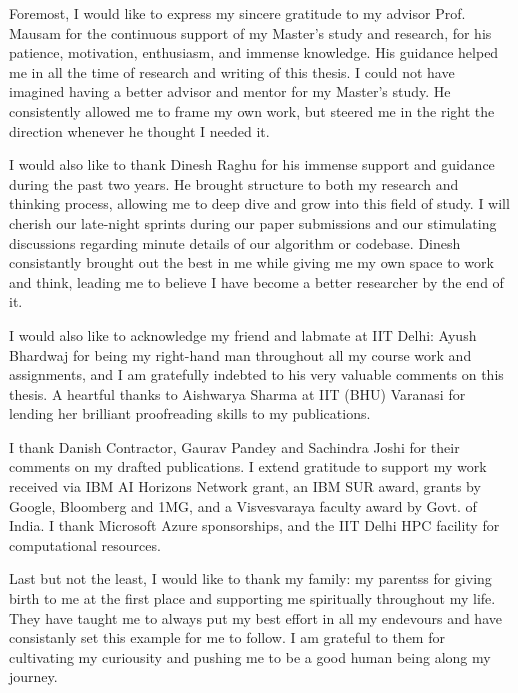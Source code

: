 Foremost, I would like to express my sincere gratitude to my advisor Prof. Mausam for the continuous support of my Master's study and research, for his patience, motivation, enthusiasm, and immense knowledge. His guidance helped me in all the time of research and writing of this thesis. I could not have imagined having a better advisor and mentor for my Master's study. He consistently allowed me to frame my own work, but steered me in the right the direction whenever he thought I needed it.

I would also like to thank Dinesh Raghu for his immense support and guidance during the past two years. He brought structure to both my research and thinking process, allowing me to deep dive and grow into this field of study. I will cherish our late-night sprints during our paper submissions and our stimulating discussions regarding minute details of our algorithm or codebase. Dinesh consistantly brought out the best in me while giving me my own space to work and think, leading me to believe I have become a better researcher by the end of it.

I would also like to acknowledge my friend and labmate at IIT Delhi: Ayush Bhardwaj for being my right-hand man throughout all my course work and assignments, and I am gratefully indebted to his very valuable comments on this thesis. A heartful thanks to Aishwarya Sharma at IIT (BHU) Varanasi for lending her brilliant proofreading skills to my publications.

I thank Danish Contractor, Gaurav Pandey and Sachindra Joshi for their comments on my drafted publications. I extend gratitude to support my work received via IBM AI Horizons Network grant, an IBM SUR award, grants by Google, Bloomberg and 1MG, and a Visvesvaraya faculty award by Govt. of India. I thank Microsoft Azure sponsorships, and the IIT Delhi HPC facility for computational resources.

Last but not the least, I would like to thank my family: my parentss for giving birth to me at the first place and supporting me spiritually throughout my life. They have taught me to always put my best effort in all my endevours and have consistanly set this example for me to follow. I am grateful to them for cultivating my curiousity and pushing me to be a good human being along my journey.